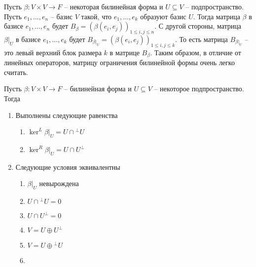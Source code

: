 Пусть $\beta\colon V\times V\to F$ -- некоторая билинейная форма и $U\subseteq V$ -- подпространство.
Пусть $e_1,\ldots,e_n$ -- базис $V$ такой, что $e_1,\ldots,e_k$ образуют базис $U$.
Тогда матрица $\beta$ в базисе $e_1,\ldots,e_n$ будет $B_{\beta} = (\beta(e_i, e_j))_{1\leqslant i,j \leqslant n}$.
С другой стороны, матрица $\beta|_U$ в базисе $e_1,\ldots,e_k$ будет $B_{\beta|_U} = (\beta(e_i, e_j))_{1\leqslant i,j \leqslant k}$.
То есть матрица $B_{\beta|_U}$ -- это левый верхний блок размера $k$ в матрице $B_{\beta}$.
Таким образом, в отличие от линейных операторов, матрицу ограничения  билинейной формы очень легко считать.

\begin{claim}
\label{claim::NonDegRestrictionBil}
Пусть $\beta\colon V\times V\to F$ -- билинейная форма и $U\subseteq V$ -- некоторое подпространство.
Тогда
\begin{enumerate}
\item Выполнены следующие равенства
\begin{enumerate}
\item $\ker^L \beta|_U = U\cap {}^\bot U$

\item $\ker^R \beta|_U = U \cap U^\bot$
\end{enumerate}

\item Следующие условия эквивалентны
\begin{multicols}{2}
\begin{enumerate}
\item $\beta|_U$ невырождена

\item $U\cap {}^\bot U = 0$

\item $U \cap U^\bot = 0$

\item $V = U\oplus U^\bot$

\item $V = U\oplus{}^\bot U$

\item[\vspace{\fill}]
\end{enumerate}
\end{multicols}
\end{enumerate}
\end{claim}
